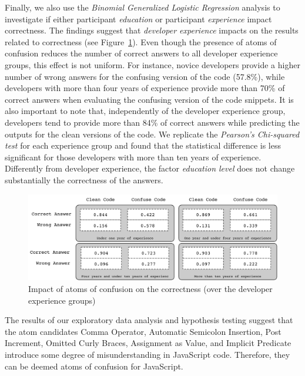{\color{blue}Finally, we also use the \emph{Binomial Generalized Logistic Regression} analysis to investigate if either participant \emph{education} or participant \emph{experience} impact correctness. The findings suggest that \emph{developer experience} impacts on the results related to correctness (see Figure~\ref{fig:correctness-over-experience}). Even though the presence of atoms of confusion reduces the number of correct answers to all developer experience groups, this effect is not uniform. For instance, novice developers provide a higher number of wrong answers for the confusing version of the code (57.8\%), while developers with more than four years of experience provide more than 70\% of correct answers when evaluating the confusing version of the code snippets. It is also important to note that, independently of the developer experience group, developers tend to provide more than 84\% of correct answers while predicting the outputs for the clean versions of the code.} {\color{red}We replicate the \emph{Pearson's Chi-squared test} for each experience group and found that the statistical difference is less significant for those developers with more than ten years of experience.} Differently from developer experience, the factor \emph{education level} does not change substantially the correctness of the answers. 


\begin{figure}
  \includegraphics[scale=0.35]{images/correctness-by-experience}
  \caption{Impact of atoms of confusion on the correctness (over the developer experience groups)}
  \label{fig:correctness-over-experience}
\end{figure}


\begin{mh}
  The results of our exploratory data analysis and   hypothesis testing suggest that the atom candidates Comma Operator, Automatic Semicolon Insertion, Post Increment, Omitted Curly Braces, Assignment as Value, and Implicit Predicate %
  introduce some degree of misunderstanding in JavaScript code. %
  Therefore, they can be deemed atoms of confusion for JavaScript.
\end{mh}

